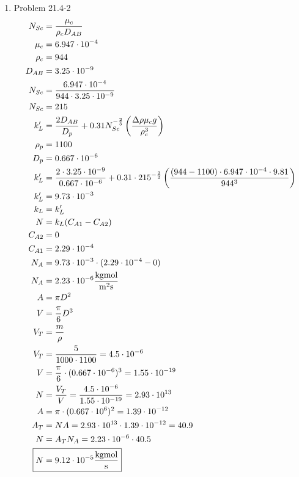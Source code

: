 \documentclass[12pt]{article}
\begin{document}
\begin{enumerate}
\newpage
    \item Problem 21.4-2
    \begin{align*}
        N_{Sc} &= \frac{\mu_c}{\rho_c D_{AB}} \\
        \mu_c &= 6.947 \cdot 10^{-4} \\
        \rho_c &= 944 \\
        D_{AB} &= 3.25 \cdot 10^{-9} \\
        N_{Sc} &= \frac{6.947 \cdot 10^{-4}}{944 \cdot 3.25 \cdot 10^{-9} } \\
        N_{Sc} &= 215 \\
        k_L' &= \frac{2 D_{AB}}{D_p} + 0.31 N_{Sc}^{-\frac{2}{3}} \left( \frac{\Delta\rho \mu_c g}{\rho_c^3} \right) \\
        \rho_p &= 1100 \\
        D_p &= 0.667 \cdot 10^{-6} \\
        k_L' &= \frac{2 \cdot 3.25 \cdot 10^{-9} }{0.667 \cdot 10^{-6}} + 0.31 \cdot 215^{-\frac{2}{3}} \left( \frac{(944-1100) \cdot 6.947 \cdot 10^{-4} \cdot 9.81}{944^3} \right) \\
        k_L' &= 9.73 \cdot 10^{-3} \\
        k_L &= k_L' \\
        N &= k_L (C_{A1} - C_{A2}) \\
        C_{A2} &= 0 \\
        C_{A1} &= 2.29 \cdot 10^{-4} \\
        N_A &= 9.73 \cdot 10^{-3} \cdot (2.29 \cdot 10^{-4} - 0) \\
        N_A &= 2.23 \cdot 10^{-6} \frac{\mathrm{kg mol}}{\mathrm{m}^2 \mathrm{s}} \\
        A &= \pi D^2 \\
        V &= \frac{\pi}{6} D^3 \\
        V_T &= \frac{m}{\rho} \\
        V_T &= \frac{5}{1000 \cdot 1100} = 4.5 \cdot 10^{-6} \\
        V &= \frac{\pi}{6} \cdot (0.667 \cdot 10^{-6})^3 = 1.55 \cdot 10^{-19} \\
        N &= \frac{V_T}{V} = \frac{4.5 \cdot 10^{-6}}{1.55 \cdot 10^{-19}} = 2.93 \cdot 10^{13} \\
        A &= \pi \cdot (0.667 \cdot 10^{6})^2 = 1.39 \cdot 10^{-12} \\
        A_T &= N A = 2.93 \cdot 10^{13} \cdot 1.39 \cdot 10^{-12} = 40.9 \\
        N &= A_T N_A = 2.23 \cdot 10^{-6} \cdot 40.5 \\
        \Aboxed{N &= 9.12 \cdot 10^{-5} \frac{\mathrm{kg mol}}{\mathrm{s}}}
    \end{align*}


\end{enumerate}
\end{document}
